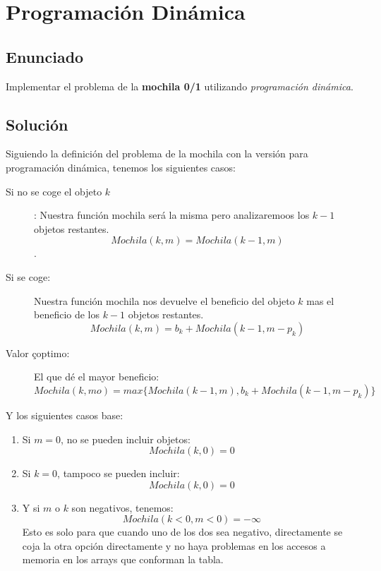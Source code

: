 \documentclass[10pt,a4paper,spanish]{report}
\theoremstyle{definition}
\theoremstyle{remark}
\begin{document}
\section{\textcolor[rgb]{0.1,0.2,1}Programación Dinámica}

\subsection{\textcolor[rgb]{0.1,0.2,1}Enunciado}

Implementar el problema de la \textbf{\textcolor[rgb]{0.1,0.2,1}{mochila 0/1}} utilizando \textit{\textcolor[rgb]{0.1,0.2,1}{programación dinámica}}.

\subsection{\textcolor[rgb]{0.1,0.2,1}Solución}

Siguiendo la definición del problema de la mochila con la versión para programación dinámica, tenemos los siguientes casos:

\begin{description}
  \item [Si no se coge el objeto $k$]: Nuestra función mochila será la misma pero analizaremoos los $k-1$ objetos restantes.
  $$Mochila(k,m) = Mochila(k-1,m)$$.
  \item [Si se coge:] Nuestra función mochila nos devuelve el beneficio del objeto $k$ mas el beneficio de los $k-1$ objetos restantes.
  $$Mochila(k,m) = b_k + Mochila(k-1, m-p_k)$$
  \item [Valor çoptimo:] El que dé el mayor beneficio:
  $$Mochila(k,mo) = max\{Mochila(k-1,m), b_k + Mochila(k-1, m-p_k)\}$$
\end{description}

Y los siguientes casos base:

\begin{enumerate}[---]
  \item Si $m=0$, no se pueden incluir objetos:
  $$Mochila(k,0) = 0$$
  \item Si $k=0$, tampoco se pueden incluir:
  $$Mochila(k,0) = 0$$
  \item Y si $m$ o $k$ son negativos, tenemos:
  $$Mochila(k<0,m<0) = -\infty$$
  Esto es solo para que cuando uno de los dos sea negativo, directamente se coja la otra opción directamente y no haya problemas en los accesos a memoria en los arrays que conforman la tabla.
\end{enumerate}
\end{document}
